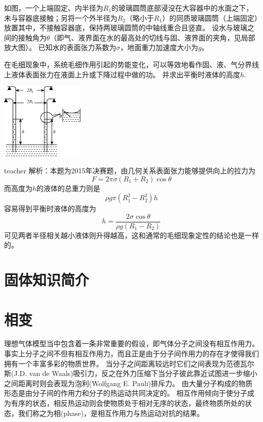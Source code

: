 \begin{example}
如图，一个上端固定、内半径为$R_1$的玻璃圆筒底部浸没在大容器中的水面之下，未与容器底接触；另将一个外半径为$R_2$（略小于$R_1$）的同质玻璃圆筒（上端固定）放置其中，不接触容器底，保持两玻璃圆筒的中轴线重合且竖直。
设水与玻璃之间的接触角为$\theta$（即气、液界面在水的最高处的切线与固、液界面的夹角，见局部放大图）。
已知水的表面张力系数为$\sigma$，地面重力加速度大小为$g$。

在毛细现象中，系统毛细作用引起的势能变化，可以等效地看作固、液、气分界线上液体表面张力在液面上升或下降过程中做的功。
并求出平衡时液体的高度$h$.
\begin{flushright}
\includegraphics[width=0.3\textwidth]{images/height-problem.pdf}
\end{flushright}
\begin{taggedblock}{teacher}
\noindent
解析：本题为2015年决赛题，由几何关系表面张力能够提供向上的拉力为
\[
F = 2\pi \sigma (R_1+R_2)\cos\theta
\]
而高度为$h$的液体的总重力则是
\[
\rho g \pi(R_1^2-R_2^2)h
\]
容易得到平衡时液体的高度为
\[
h=\frac{2\sigma \cos\theta}{\rho g (R_1-R_2)}
\]
可见两者半径相关越小液体则升得越高，这和通常的毛细现象定性的结论也是一样的。
\end{taggedblock}
\end{example}

\section{固体知识简介}




\section{相变}
理想气体模型当中包含着一条非常重要的假设，即气体分子之间没有相互作用力。
事实上分子之间不但有相互作用力，而且正是由于分子间作用力的存在才使得我们拥有一个丰富多彩的物质世界。
当分子之间距离较远时它们之间表现为范德瓦尔斯(J.D. van de Waals)吸引力，反之在外力压缩下当分子彼此靠近试图进一步缩小之间距离时则会表现为泡利(Wolfgang E. Pauli)排斥力。
由大量分子构成的物质形态是由分子间的作用力和分子的热运动共同决定的。
相互作用倾向于使分子成为有序的状态，相反热运动则会使物质处于相对无序的状态，最终物质所处的状态，我们称之为{\heiti 相}(phase)，是相互作用力与热运动对抗的结果。

